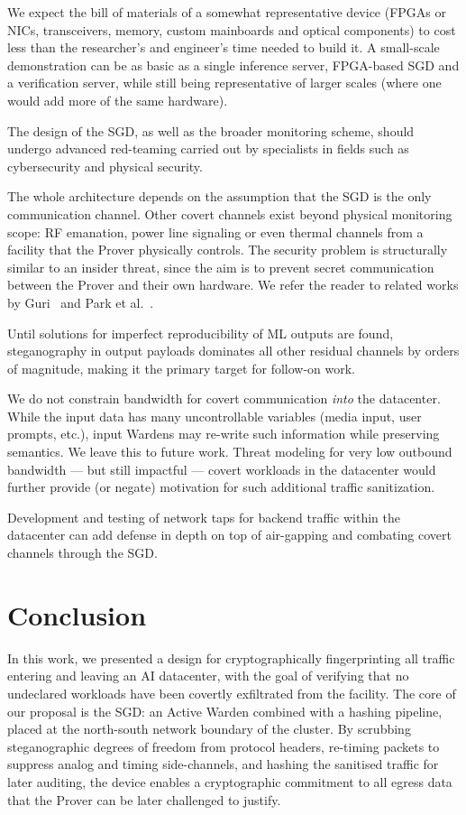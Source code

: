 \documentclass{article}
\begin{document}
We expect the bill of materials of a somewhat representative device (FPGAs or NICs, transceivers, memory, custom mainboards and optical components) to cost less than the researcher's and engineer's time needed to build it. A small-scale demonstration can be as basic as a single inference server, FPGA-based SGD and a verification server, while still being representative of larger scales (where one would add more of the same hardware).

The design of the SGD, as well as the broader monitoring scheme, should undergo advanced red-teaming carried out by specialists in fields such as cybersecurity and physical security.

The whole architecture depends on the assumption that the SGD is the only communication channel. Other covert channels exist beyond physical monitoring scope: RF emanation, power line signaling or even thermal channels from a facility that the Prover physically controls. The security problem is structurally similar to an insider threat, since the aim is to prevent secret communication between the Prover and their own hardware. We refer the reader to related works by Guri~\cite{guri2024airgap} and Park et al.~\cite{park2023airgap}.

Until solutions for imperfect reproducibility of ML outputs are found, steganography in output payloads dominates all other residual channels by orders of magnitude, making it the primary target for follow-on work.

We do not constrain bandwidth for covert communication \textit{into} the datacenter. While the input data has many uncontrollable variables (media input, user prompts, etc.), input Wardens may re-write such information while preserving semantics. We leave this to future work. Threat modeling for very low outbound bandwidth --- but still impactful --- covert workloads in the datacenter would further provide (or negate) motivation for such additional traffic sanitization.

Development and testing of network taps for backend traffic within the datacenter can add defense in depth on top of air-gapping and combating covert channels through the SGD.

\section{Conclusion}
\label{sec:conclusion}

In this work, we presented a design for cryptographically fingerprinting all traffic entering and leaving an AI datacenter, with the goal of verifying that no undeclared workloads have been covertly exfiltrated from the facility. The core of our proposal is the SGD: an Active Warden combined with a hashing pipeline, placed at the north-south network boundary of the cluster. By scrubbing steganographic degrees of freedom from protocol headers, re-timing packets to suppress analog and timing side-channels, and hashing the sanitised traffic for later auditing, the device enables a cryptographic commitment to all egress data that the Prover can be later challenged to justify.
\end{document}
